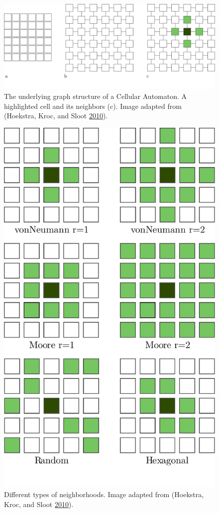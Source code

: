\documentclass[
  12pt,
  openany]{book}
\begin{document}
\begin{figure}

{\centering \includegraphics[width=0.8\linewidth]{pics/graph_structure} 

}

\caption{The underlying graph structure of a Cellular Automaton. A highlighted cell and its neighbors (c). Image adapted from (Hoekstra, Kroc, and Sloot \protect\hyperlink{ref-hoekstra2010simulating}{2010}).}\label{fig:CA-lattice}
\end{figure}



\begin{figure}

{\centering \includegraphics[width=0.8\linewidth]{pics/neighborhoods} 

}

\caption{Different types of neighborhoods. Image adapted from (Hoekstra, Kroc, and Sloot \protect\hyperlink{ref-hoekstra2010simulating}{2010}).}\label{fig:CA-neighborhoods}
\end{figure}
\end{document}
